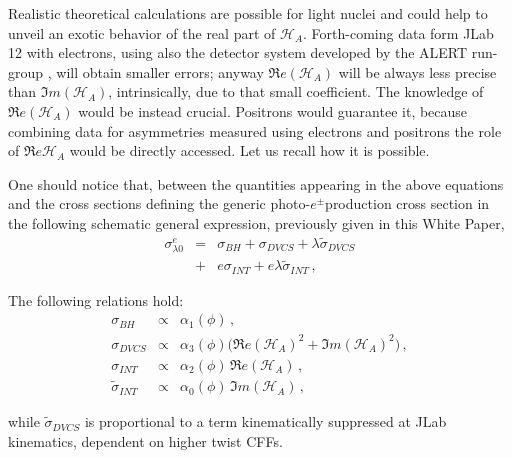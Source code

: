 \documentclass[times, twoside]{PosWhiPap}
\begin{document}
Realistic theoretical calculations are possible for light nuclei and could help 
to unveil an exotic behavior of the real part of $\mathcal{H}_{A}$.
Forth-coming data form JLab 12 with electrons, using also the detector system
developed by the ALERT run-group \cite{Armstrong:2017wfw}, will obtain smaller 
errors; anyway $\Re e(\mathcal{H}_{A})$ will be always less precise than
$\Im m(\mathcal{H}_{A})$, intrinsically, due to that small coefficient.
The knowledge of $\Re e(\mathcal{H}_{A})$ would be instead crucial.
Positrons would guarantee it, because combining data for asymmetries measured 
using electrons and positrons the role of $\Re e \mathcal{H}_{A}$ would be 
directly accessed. Let us recall how it is possible.

One should notice that, between the quantities appearing in the above
equations and the cross sections defining the generic photo-$e^\pm$production 
cross section in the following schematic general expression, previously given 
in this White Paper,
\begin{eqnarray}
\sigma^e_{\lambda 0}  & = & \sigma_{BH} + \sigma_{DVCS} + \lambda \tilde \sigma_{DVCS} 
\nonumber
\\
& + & e\sigma_{INT} + e \lambda \tilde \sigma_{INT} \, ,
\label{gen}
\end{eqnarray}

The following relations hold:
\begin{eqnarray}
\sigma_{BH} & \propto & \alpha_1(\phi)\, ,
\nonumber \\
\sigma_{DVCS} & \propto &   \alpha_{3}(\phi) 
\big( \Re e(\mathcal{H}_{A})^{2} + \Im m(\mathcal{H}_{A})^{2} \big) \, ,
\nonumber \\
\sigma_{INT} & \propto & \alpha_{2}(\phi) \, \Re e(\mathcal{H}_{A}) \, ,
\nonumber \\
\tilde \sigma_{INT} & \propto & \alpha_{0}(\phi) \, \Im m(\mathcal{H}_{A}) \, ,
\end{eqnarray}

while $\tilde \sigma_{DVCS} $ is proportional to a term kinematically suppressed
at JLab kinematics, dependent on higher twist CFFs. 
\end{document}
